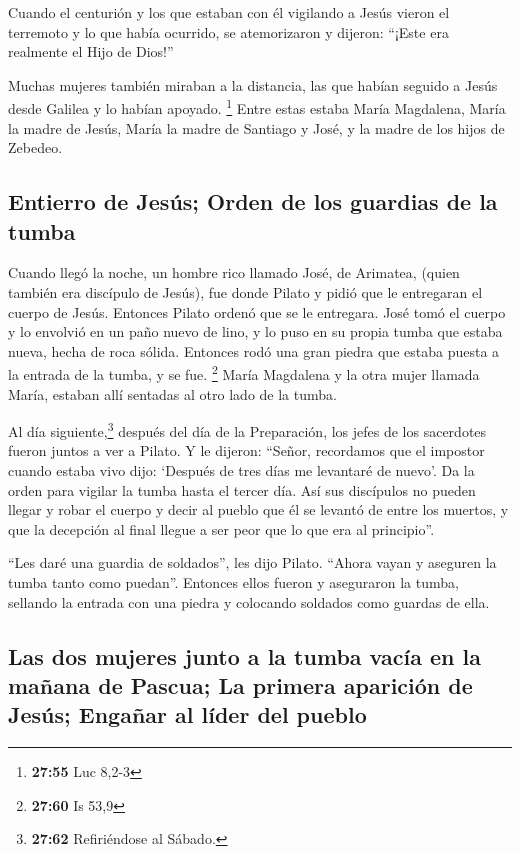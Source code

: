  Cuando el centurión y los que estaban con él vigilando a
Jesús vieron el terremoto y lo que había ocurrido, se atemorizaron y
dijeron: ``¡Este era realmente el Hijo de Dios!''

 Muchas mujeres también miraban a la distancia, las que
habían seguido a Jesús desde Galilea y lo habían apoyado. \footnote{\textbf{27:55}
  Luc 8,2-3}  Entre estas estaba María Magdalena, María
la madre de Jesús, María la madre de Santiago y José, y la madre de los
hijos de Zebedeo.

\hypertarget{entierro-de-jesuxfas-orden-de-los-guardias-de-la-tumba}{%
\subsection{Entierro de Jesús; Orden de los guardias de la
tumba}\label{entierro-de-jesuxfas-orden-de-los-guardias-de-la-tumba}}

 Cuando llegó la noche, un hombre rico llamado José, de
Arimatea, (quien también era discípulo de Jesús),  fue
donde Pilato y pidió que le entregaran el cuerpo de Jesús. Entonces
Pilato ordenó que se le entregara.  José tomó el cuerpo y
lo envolvió en un paño nuevo de lino,  y lo puso en su
propia tumba que estaba nueva, hecha de roca sólida. Entonces rodó una
gran piedra que estaba puesta a la entrada de la tumba, y se fue.
\footnote{\textbf{27:60} Is 53,9}  María Magdalena y la
otra mujer llamada María, estaban allí sentadas al otro lado de la
tumba.

 Al día siguiente,\footnote{\textbf{27:62} Refiriéndose
  al Sábado.} después del día de la Preparación, los jefes de los
sacerdotes fueron juntos a ver a Pilato.  Y le dijeron:
``Señor, recordamos que el impostor cuando estaba vivo dijo: `Después de
tres días me levantaré de nuevo'.  Da la orden para
vigilar la tumba hasta el tercer día. Así sus discípulos no pueden
llegar y robar el cuerpo y decir al pueblo que él se levantó de entre
los muertos, y que la decepción al final llegue a ser peor que lo que
era al principio''.

 ``Les daré una guardia de soldados'', les dijo Pilato.
``Ahora vayan y aseguren la tumba tanto como puedan''. 
Entonces ellos fueron y aseguraron la tumba, sellando la entrada con una
piedra y colocando soldados como guardas de ella.

\hypertarget{las-dos-mujeres-junto-a-la-tumba-vacuxeda-en-la-mauxf1ana-de-pascua-la-primera-apariciuxf3n-de-jesuxfas-engauxf1ar-al-luxedder-del-pueblo}{%
\subsection{Las dos mujeres junto a la tumba vacía en la mañana de
Pascua; La primera aparición de Jesús; Engañar al líder del
pueblo}\label{las-dos-mujeres-junto-a-la-tumba-vacuxeda-en-la-mauxf1ana-de-pascua-la-primera-apariciuxf3n-de-jesuxfas-engauxf1ar-al-luxedder-del-pueblo}}

